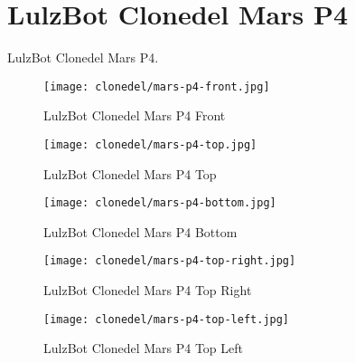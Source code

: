 %
%
%
%
%

\section{LulzBot Clonedel Mars P4}
LulzBot Clonedel Mars P4.

\begin{figure}[h!]
\texttt{[image: clonedel/mars-p4-front.jpg]}
 \caption{LulzBot Clonedel Mars P4 Front}
 \label{fig:clonedel-mars-p4-front}
\end{figure}

\begin{figure}[h!]
\texttt{[image: clonedel/mars-p4-top.jpg]}
 \caption{LulzBot Clonedel Mars P4 Top}
 \label{fig:clonedel-mars-p4-top}
\end{figure}

\begin{figure}[h!]
\texttt{[image: clonedel/mars-p4-bottom.jpg]}
 \caption{LulzBot Clonedel Mars P4 Bottom}
 \label{fig:clonedel-mars-p4-bottom}
\end{figure}

\begin{figure}[h!]
\texttt{[image: clonedel/mars-p4-top-right.jpg]}
 \caption{LulzBot Clonedel Mars P4 Top Right}
 \label{fig:clonedel-mars-p4-top-right}
\end{figure}

\begin{figure}[h!]
\texttt{[image: clonedel/mars-p4-top-left.jpg]}
 \caption{LulzBot Clonedel Mars P4 Top Left}
 \label{fig:clonedel-mars-p4-top-left}
\end{figure}

